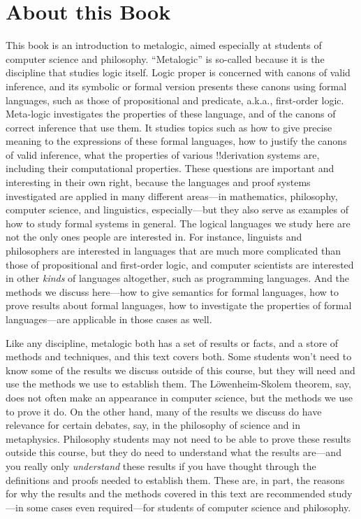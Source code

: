 
\chapter{About this Book}

This book is an introduction to metalogic, aimed especially at
students of computer science and philosophy. ``Metalogic'' is
so-called because it is the discipline that studies logic itself.
Logic proper is concerned with canons of valid inference, and its
symbolic or formal version presents these canons using formal
languages, such as those of propositional and predicate, a.k.a.,
first-order logic. Meta-logic investigates the properties of these
language, and of the canons of correct inference that use them. It
studies topics such as how to give precise meaning to the expressions
of these formal languages, how to justify the canons of valid
inference, what the properties of various !!{derivation} systems are, including
their computational properties. These questions are important and
interesting in their own right, because the languages and proof
systems investigated are applied in many different areas---in
mathematics, philosophy, computer science, and linguistics,
especially---but they also serve as examples of how to study formal
systems in general. The logical languages we study here are not the
only ones people are interested in. For instance, linguists and
philosophers are interested in languages that are much more
complicated than those of propositional and first-order logic, and
computer scientists are interested in other \emph{kinds} of languages
altogether, such as programming languages. And the methods we discuss
here---how to give semantics for formal languages, how to prove
results about formal languages, how to investigate the properties of
formal languages---are applicable in those cases as well.

Like any discipline, metalogic both has a set of results or facts,
and a store of methods and techniques, and this text covers both.
Some students won't need to know some of the results we discuss
outside of this course, but they will need and use the methods we use
to establish them. The L\"owenheim-Skolem theorem, say, does not
often make an appearance in computer science, but the methods we use
to prove it do. On the other hand, many of the results we discuss do
have relevance for certain debates, say, in the philosophy of science
and in metaphysics. Philosophy students may not need to be able to
prove these results outside this course, but they do need to
understand what the results are---and you really only
\emph{understand} these results if you have thought through the
definitions and proofs needed to establish them. These are, in part,
the reasons for why the results and the methods covered in this text
are recommended study---in some cases even required---for students of
computer science and philosophy.

